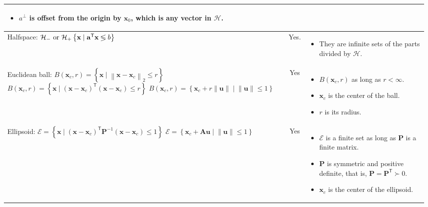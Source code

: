 \documentclass{article}
\newcommand{\trans}{\mathsf{T}}
\newcommand\norm[1]{\left\lVert#1\right\rVert}
\begin{document}
\begin{landscape}
\begin{table}
\begin{tabular}{|l|c|p{7cm}|}
\begin{itemize}[leftmargin=*]
            \item \(a^{\perp}\) is offset from the origin by \(\mathbf{x}_0\), which is any vector in \(\mathcal{H}\).
        \end{itemize} \\
        \hline
        \makecell{Halfspace: \\ \(\mathcal{H}_{-}\textnormal{ or }\mathcal{H}_{+}\left\{ \mathbf{x} \mid \mathbf{a}^\trans \mathbf{x} \lessgtr b \right\}\)} & Yes. & \begin{itemize}[leftmargin=*]
            \item They are infinite sets of the parts divided by \(\mathcal{H}\).
        \end{itemize}\\
        \hline
        \makecell{Euclidean ball: \\ \(B(\mathbf{x}_c, r) = \left\{ \mathbf{x} \mid \norm{\mathbf{x}-\mathbf{x}_c}_2 \leq r \right\}\) \\ \(B(\mathbf{x}_c, r) = \left\{ \mathbf{x} \mid \left( \mathbf{x}-\mathbf{x}_c \right)^\trans \left( \mathbf{x}-\mathbf{x}_c \right) \leq r \right\}\) \\ \(B(\mathbf{x}_c, r) = \left\{ \mathbf{x}_c + r \norm{\mathbf{u}} \mid \norm{\mathbf{u}} \leq 1 \right\}\)} & Yes & \begin{itemize}[leftmargin=*]
            \item \(B(\mathbf{x}_c, r)\) as long as \(r < \infty\).
            \item \(\mathbf{x}_c\) is the center of the ball.
            \item \(r\) is its radius.
        \end{itemize} \\
        \hline
        \makecell{Ellipsoid:\\\(\mathcal{E} = \left\{ \mathbf{x} \mid (\mathbf{x}-\mathbf{x}_c)^\trans\mathbf{P}^{-1}(\mathbf{x}-\mathbf{x}_c) \leq 1 \right\}\) \\ \(\mathcal{E} = \left\{ \mathbf{x}_{c} + \mathbf{Au} \mid \norm{\mathbf{u}} \leq 1 \right\}\)} & Yes & \begin{itemize}[leftmargin=*]
            \item \(\mathcal{E}\) is a finite set as long as \(\mathbf{P}\) is a finite matrix.
            \item \(\mathbf{P}\) is symmetric and positive definite, that is, \(\mathbf{P}=\mathbf{P}^\trans \succ 0\).
            \item \(\mathbf{x}_{c}\) is the center of the ellipsoid.

\end{itemize}
\end{tabular}
\end{table}
\end{landscape}
\end{document}
